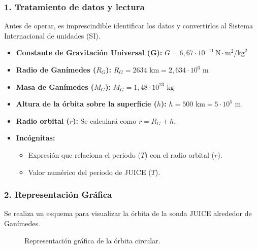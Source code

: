 \subsubsection*{1. Tratamiento de datos y lectura}
Antes de operar, es imprescindible identificar los datos y convertirlos al Sistema Internacional de unidades (SI).
\begin{itemize}
    \item \textbf{Constante de Gravitación Universal (G):} $G = 6,67 \cdot 10^{-11} \, \text{N}\cdot\text{m}^2/\text{kg}^2$
    \item \textbf{Radio de Ganímedes ($R_G$):} $R_G = 2634 \text{ km} = 2,634 \cdot 10^{6} \text{ m}$
    \item \textbf{Masa de Ganímedes ($M_G$):} $M_G = 1,48 \cdot 10^{23} \text{ kg}$
    \item \textbf{Altura de la órbita sobre la superficie ($h$):} $h = 500 \text{ km} = 5 \cdot 10^{5} \text{ m}$
    \item \textbf{Radio orbital ($r$):} Se calculará como $r = R_G + h$.
    \item \textbf{Incógnitas:}
    \begin{itemize}
        \item Expresión que relaciona el periodo ($T$) con el radio orbital ($r$).
        \item Valor numérico del periodo de JUICE ($T$).
    \end{itemize}
\end{itemize}

\subsubsection*{2. Representación Gráfica}
Se realiza un esquema para visualizar la órbita de la sonda JUICE alrededor de Ganímedes.
\begin{figure}[H]
    \centering
    \vspace{0.5cm} %
    \caption{Representación gráfica de la órbita circular.}
\end{figure}

